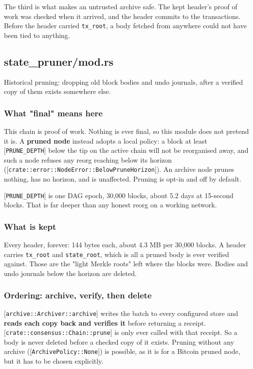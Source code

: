 \documentclass[11pt,a4paper]{article}
\begin{document}
The third is what makes an untrusted archive safe. The kept header's proof
of work was checked when it arrived, and the header commits to the
transactions. Before the header carried \texttt{tx\_root}, a body fetched from
anywhere could not have been tied to anything.

\subsection{state\_pruner/mod.rs}
Historical pruning: dropping old block bodies and undo journals, after a
verified copy of them exists somewhere else.

\subsubsection{What "final" means here}

This chain is proof of work. Nothing is ever final, so this module does not
pretend it is. A \textbf{pruned node} instead adopts a local policy: a block at
least [\texttt{PRUNE\_DEPTH}] below the tip on the active chain will not be
reorganised away, and such a node refuses any reorg reaching below its
horizon ([\texttt{crate::error::NodeError::BelowPruneHorizon}]). An archive node
prunes nothing, has no horizon, and is unaffected. Pruning is opt-in and
off by default.

[\texttt{PRUNE\_DEPTH}] is one DAG epoch, 30,000 blocks, about 5.2 days at 15-second
blocks. That is far deeper than any honest reorg on a working network.

\subsubsection{What is kept}

Every header, forever: 144 bytes each, about 4.3 MB per 30,000 blocks.
A header carries \texttt{tx\_root} and \texttt{state\_root}, which is all a pruned body is
ever verified against. Those are the "light Merkle roots" left where the
blocks were. Bodies and undo journals below the horizon are deleted.

\subsubsection{Ordering: archive, verify, then delete}

[\texttt{archive::Archiver::archive}] writes the batch to every configured store
and \textbf{reads each copy back and verifies it} before returning a receipt.
[\texttt{crate::consensus::Chain::prune}] is only ever called with that receipt.
So a body is never deleted before a checked copy of it exists. Pruning
without any archive ([\texttt{ArchivePolicy::None}]) is possible, as it is for a
Bitcoin pruned node, but it has to be chosen explicitly.
\end{document}
